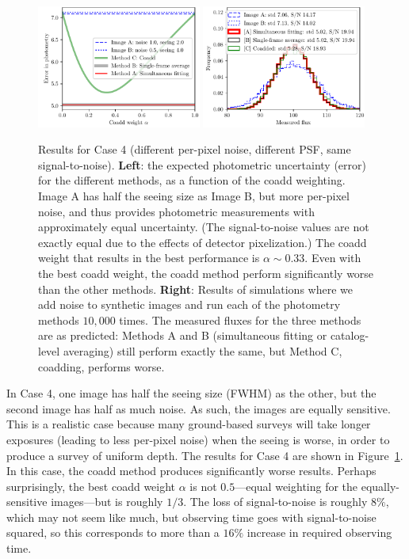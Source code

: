 \documentclass[letter,11pt]{article}
\begin{document}
\begin{figure}[b!]
  \begin{center}
    \includegraphics[width=0.48\textwidth]{coadd-06}
    \includegraphics[width=0.48\textwidth]{coadd-07}
  \end{center}
  \caption{Results for Case 4 (different per-pixel noise, different
    PSF, same signal-to-noise).  \textbf{Left}: the expected
    photometric uncertainty (error) for the different methods, as a
    function of the coadd weighting.  Image A has half the seeing size
    as Image B, but more per-pixel noise, and thus provides
    photometric measurements with approximately equal uncertainty.
    (The signal-to-noise values are not exactly equal due to the
    effects of detector pixelization.)  The coadd weight that results
    in the best performance is $\alpha \sim 0.33$.  Even with the best
    coadd weight, the coadd method perform significantly worse than the
    other methods.
    \newline \textbf{Right}: Results of simulations where we add noise
    to synthetic images and run each of the photometry methods
    $10,000$ times.  The measured fluxes for the three methods are as
    predicted: Methods A and B (simultaneous fitting or catalog-level
    averaging) still perform exactly the same, but Method C, coadding,
    performs worse.
    \label{fig:casefour}}
\end{figure}

In Case 4, one image has half the seeing size (FWHM) as the other, but
the second image has half as much noise.  As such, the images are
equally sensitive.  This is a realistic case because many ground-based
surveys will take longer exposures (leading to less per-pixel noise)
when the seeing is worse, in order to produce a survey of uniform
depth.  The results for Case 4 are shown in Figure~\ref{fig:casefour}.
In this case, the coadd method produces significantly worse results.
Perhaps surprisingly, the best coadd weight $\alpha$ is not
$0.5$---equal weighting for the equally-sensitive images---but is
roughly $1/3$.  The loss of signal-to-noise is roughly $8\%$, which
may not seem like much, but observing time goes with signal-to-noise
squared, so this corresponds to more than a $16\%$ increase in
required observing time.
\end{document}

